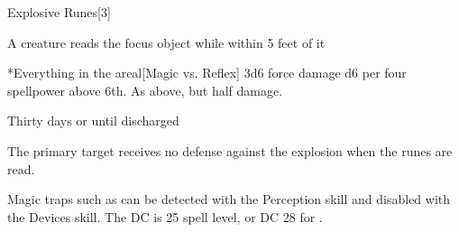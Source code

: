 \begin{spellsection}{Explosive Runes}[3]
    \begin{spellheader}
    \end{spellheader}
    \begin{spellcontent}
        \begin{spelltargetinginfo}
        \end{spelltargetinginfo}
        \begin{spelleffects}

            \spellline
            \begin{spelltrigger}{A creature reads the focus object while within 5 feet of it}
                \begin{spelltargets}*{Everything in the area}l[Magic vs. Reflex]
                    \spellsuccess 3d6 force damage \add d6 per four spellpower above 6th.
                    \spellfailure As above, but half damage.
                \end{spelltargets}
            \end{spelltrigger}
            \spelldur Thirty days or until discharged \dismissable
        \end{spelleffects}
    \end{spellcontent}
    \begin{spellfooter}
        \spellnotes The primary target receives no defense against the explosion when the runes are read.

        Magic traps such as  can be detected with the Perception skill and disabled with the Devices skill. The DC is 25 \add spell level, or DC 28 for .
    \end{spellfooter}
\end{spellsection}

